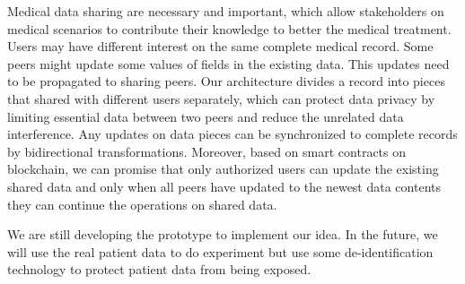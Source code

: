 \documentclass[conference]{IEEEtran}
\begin{document}
Medical data sharing are necessary and important, which allow stakeholders on medical scenarios to contribute their knowledge to better the medical treatment. Users may have different interest on the same complete medical record. Some peers might update some values of fields in the existing data. This updates need to be propagated to sharing peers. Our architecture divides a record into pieces that shared with different users separately, which can protect data privacy by limiting essential data between two peers and reduce the unrelated data interference. Any updates on data pieces can be synchronized to complete records by bidirectional transformations. Moreover, based on smart contracts on blockchain, we can promise that only authorized users can update the existing shared data and only when all peers have updated to the newest data contents they can continue the operations on shared data.   

We are still developing the prototype to implement our idea.
In the future, we will use the real patient data to do experiment but use some de-identification technology to protect patient data from being exposed. 




\end{document}
